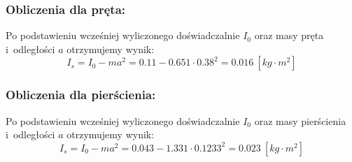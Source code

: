 \documentclass{fizraport}
\begin{document}
\subsubsection{Obliczenia dla pręta:}
Po podstawieniu wcześniej wyliczonego doświadczalnie $I_0$ oraz masy pręta i~odległości $a$ otrzymujemy wynik:
\begin{equation*}
I_s = I_0 - ma^2 = 0.11 - 0.651\cdot0.38^2= 0.016~\left[kg\cdot m^2\right]
\end{equation*}
\subsubsection{Obliczenia dla pierścienia:}
Po podstawieniu wcześniej wyliczonego doświadczalnie $I_0$ oraz masy pierścienia i~odległości $a$ otrzymujemy wynik:
\begin{equation*}
I_s = I_0 - ma^2 = 0.043 - 1.331\cdot0.1233^2= 0.023~\left[kg\cdot m^2\right]%
\end{equation*}
\end{document}
